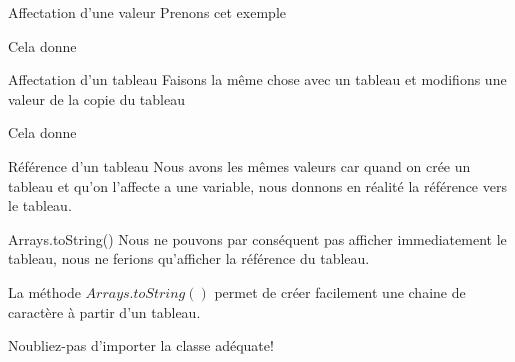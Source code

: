 \begin{frame}{Affectation d'une valeur}
    \pause
    Prenons cet exemple
    

    \pause
    Cela donne
    
\end{frame}

\begin{frame}{Affectation d'un tableau}
    Faisons la même chose avec un tableau et modifions une valeur de la copie du tableau
    

    \pause
    Cela donne
    

\end{frame}

\begin{frame}{Référence d'un tableau}
    Nous avons les mêmes valeurs car quand on crée un tableau et qu'on l'affecte a une variable,
    nous donnons en réalité la référence vers le tableau.

    \pause
    \begin{exampleblock}{Arrays.toString()}
        Nous ne pouvons par conséquent pas afficher immediatement le tableau,
        nous ne ferions qu'afficher la référence du tableau.

        \pause
        La méthode $Arrays.toString()$ permet de créer facilement une chaine de caractère à partir d'un tableau.

        \pause
        \tiny\center Noubliez-pas d'importer la classe adéquate!
        
    \end{exampleblock}
\end{frame}